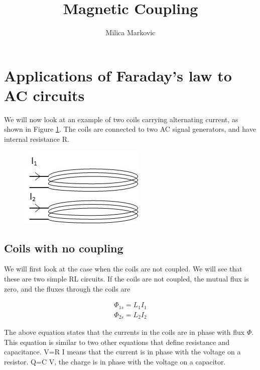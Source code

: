 \documentclass{ximera}
\title{Magnetic Coupling}
\author{Milica Markovic}
\begin{document}
  
\begin{abstract}  

\end{abstract}  
\maketitle    


\section{Applications of Faraday's law to AC circuits}


We will now look at an example of two coils carrying alternating current, as shown in Figure \ref{fig:CoupledCoilsAC}. The coils are connected to two AC signal generators, and have internal resistance R. 

\begin{figure}[htbp]
\begin{center}
\includegraphics[scale=0.7]{../jpg/coupledCoils.jpg}
\end{center}
\caption{}
\label{fig:CoupledCoilsAC}
\end{figure}

\subsection{Coils with no coupling}

We will first look at the case when the coils are not coupled. We will see that these are two simple RL circuits.
If the coils are not coupled, the mutual flux is zero, and the fluxes through the coils are

\begin{eqnarray}
\Phi_{1s}= L_1 I_1 \\
\Phi_{2s}= L_2 I_2
\end{eqnarray}

The above equation states that the currents in the coils are in phase with flux $\Phi$. This equation is similar to two other equations that define resistance and capacitance. V=R I  means that the current is in phase with the voltage on a resistor. Q=C V, the charge is in phase with the voltage on a capacitor. 
\end{document}
